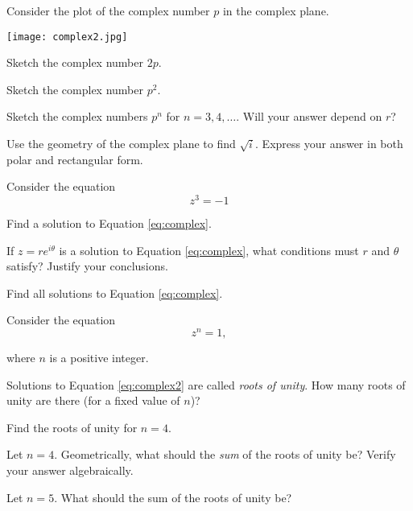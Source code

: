 \documentclass{workbook}
\begin{document}
\begin{slide}
	\question
	Consider the plot of the complex number $p$ in the complex plane.

	\texttt{[image: complex2.jpg]}

	\begin{parts}
		\item Sketch the complex number $2p$.
		\item Sketch the complex number $p^2$.
		\item Sketch the complex numbers $p^n$ for $n=3,4,\ldots$. Will your answer 
		depend on $r$?

		\bigskip 
		\item Use the geometry of the complex plane to find $\sqrt{i}$. Express
		your answer in both polar and rectangular form.
	\end{parts}
\end{slide}

\begin{slide}
	\question
	Consider the equation 
	\begin{equation}
		\label{eq:complex}
		z^3=-1
	\end{equation}

	\begin{parts}
		\item Find a solution to Equation \eqref{eq:complex}.
		\item If $z=re^{i\theta}$ is a solution to Equation \eqref{eq:complex}, 
		what conditions must $r$ and $\theta$ satisfy? Justify your conclusions.
		\item Find all solutions to Equation \eqref{eq:complex}.

	\end{parts}
\end{slide}

\begin{slide}
	\question
	Consider the equation 
		\begin{equation}
		\label{eq:complex2}
		z^n=1,
	\end{equation}

    where $n$ is a positive integer.

	\begin{parts}
		\item Solutions to Equation \eqref{eq:complex2} are called \emph{roots of unity}.
		How many roots of unity are there (for a fixed value of $n$)?
		\item Find the roots of unity for $n=4$.
		\item Let $n=4$. Geometrically, what should the \emph{sum} of the roots of unity be?
		Verify your answer algebraically.
		\item Let $n=5$. What should the sum of the roots of unity be? 

	\end{parts}
\end{slide}
\end{document}
